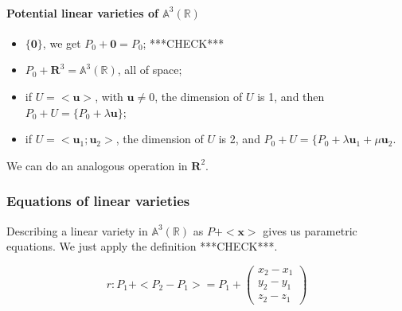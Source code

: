 \documentclass[12pt,a4paper]{report}
\numberwithin{equation}{section}
\theoremstyle{definition}
\theoremstyle{remark}
\begin{document}
\paragraph{Potential linear varieties of $\mathbb{A}^3 (\mathbb{R})$}

\begin{itemize}
\item $\lbrace \mathbf{0}\rbrace$, we get $P_0 + \mathbf{0} = P_0$; ***CHECK***
\item $P_0 + \mathbf{R}^3 = \mathbb{A}^3 (\mathbb{R})$, all of space;
\item if $U = <\mathbf{u}>$, with $\mathbf{u}\neq 0$, the dimension of $U$ is 1, and then $P_0 + U = \lbrace P_0 + \lambda \mathbf{u}\rbrace$;
\item if $U = <\mathbf{u}_1; \mathbf{u}_2>$, the dimension of $U$ is 2, and $P_0 + U = \lbrace P_0 + \lambda \mathbf{u}_1 + \mu \mathbf{u}_2$.
\end{itemize}

We can do an analogous operation in $\mathbf{R}^2$.

\subsubsection{Equations of linear varieties}

Describing a linear variety in $\mathbb{A}^3 (\mathbb{R})$ as $P + <\mathbf{x}>$ gives us parametric equations.
We just apply the definition ***CHECK***.

\begin{equation}
r: P_1 + <P_2 - P_1> = P_1 + \begin{pmatrix}
x_2 - x_1 \\
y_2 - y_1 \\
z_2 - z_1 
\end{pmatrix}
\end{equation}

\tableofcontents
\end{document}
